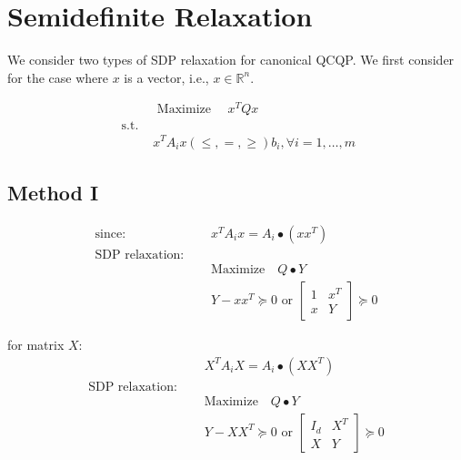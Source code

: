\documentclass[../main]{subfiles}
\begin{document}
\section{Semidefinite Relaxation}

We consider two types of SDP relaxation for canonical QCQP.
We first consider for the case where $x$ is a vector, i.e., $x \in \mathbb R^n$.

\[
    \begin{aligned}
                       & \text { Maximize } \quad x^{T} Q x                      \\
        \text { s.t. } &                                                         \\
                       & x^{T} A_{i} x(\le,=, \ge) b_{i}, \forall i=1, \ldots, m
    \end{aligned}
\]

\subsection{Method I}\label{sdp-method-1}

\[
    \begin{aligned}
        \textrm{since: }\quad          & x^{T} A_{i} x = A_i \bullet (xx^T)                               \\
        \textrm{SDP relaxation: }\quad &                                                                  \\
                                       & \mathrm{Maximize}\quad Q\bullet Y                                \\
                                       & Y-xx^T \succeq 0 \text { or }\begin{bmatrix} 1 & x^{T} \\ x & Y \end{bmatrix} \succeq 0
    \end{aligned}
\]

for matrix \(X\):
\[
    \begin{aligned}
                                       & X^{T} A_{i} X = A_i \bullet (XX^T)                               \\
        \textrm{SDP relaxation: }\quad &                                                                  \\
                                       & \mathrm{Maximize}\quad Q\bullet Y                                \\
                                       & Y-XX^T \succeq 0 \text { or }\begin{bmatrix} I_d & X^{T} \\ X & Y \end{bmatrix} \succeq 0
    \end{aligned}
\]
\end{document}
